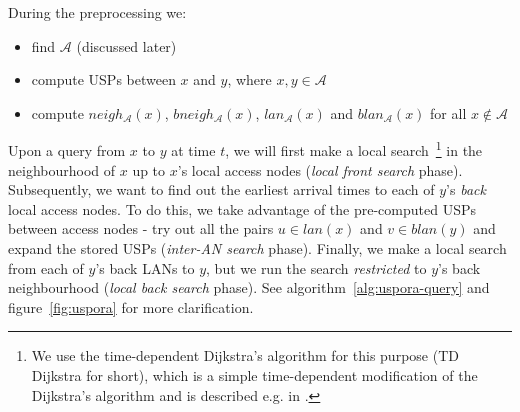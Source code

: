 \documentclass{svk_long_en}
\begin{document}
		During the preprocessing we:
		\begin{itemize}
			\item find $\mathcal{A}$ (discussed later)
			\item compute USPs between $x$ and $y$, where $x, y \in \mathcal{A}$ 
			\item compute $neigh_{\mathcal{A}}(x)$, $bneigh_{\mathcal{A}}(x)$, $lan_{\mathcal{A}}(x)$ and $blan_{\mathcal{A}}(x)$ for all $x \not \in \mathcal{A}$
		\end{itemize}
		\hspace{\fill}
		
		Upon a query from $x$ to $y$ at time $t$, we will first make a local search~\footnote{We use the time-dependent Dijkstra's algorithm for this purpose (TD Dijkstra for short), which is a simple time-dependent modification of the Dijkstra's algorithm and is described e.g. in \cite{tdroute09}.} in the neighbourhood of $x$ up to $x$'s local access nodes (\textit{local front search} phase). Subsequently, we want to find out the earliest arrival times to each of $y$'s \textit{back} local access nodes. To do this, we take advantage of the pre-computed USPs between access nodes - try out all the pairs $u \in lan(x)$ and $v \in blan(y)$ and expand the stored USPs (\textit{inter-AN search} phase). Finally, we make a local search from each of $y$'s back LANs to $y$, but we run the search \textit{restricted} to $y$'s back neighbourhood (\textit{local back search} phase). See algorithm~\ref{alg:uspora-query} and figure~\ref{fig:uspora} for more clarification.
		
\end{document}
